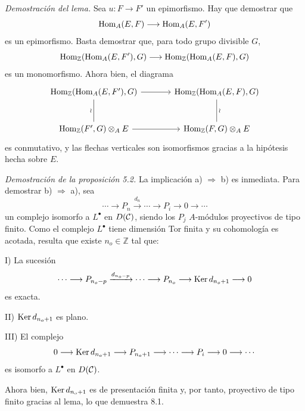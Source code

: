\emph{Demostración del lema.} Sea $u:F\to F'$ un epimorfismo. Hay que demostrar que
\[
\operatorname{Hom}_A(E,F)\longrightarrow\operatorname{Hom}_A(E,F')
\]
es un epimorfismo. Basta demostrar que, para todo grupo divisible $G$,
\[
\operatorname{Hom}_{\mathbb Z}(\operatorname{Hom}_A(E,F'),G)\longrightarrow
\operatorname{Hom}_{\mathbb Z}(\operatorname{Hom}_A(E,F),G)
\]
es un monomorfismo. Ahora bien, el diagrama
\[
\begin{tikzcd}[column sep=large,row sep=large]
\Hom_{\mathbb Z}(\Hom_A(E,F'),G)
 \arrow[r]\arrow[d,dash,"\wr"']&
\Hom_{\mathbb Z}(\Hom_A(E,F),G)\arrow[d,dash,"\wr"]\\
\Hom_{\mathbb Z}(F',G)\otimes_A E
 \arrow[r]&
\Hom_{\mathbb Z}(F,G)\otimes_A E
\end{tikzcd}
\]
es conmutativo, y las flechas verticales son isomorfismos gracias a la hipótesis hecha sobre $E$.

\emph{Demostración de la proposición 5.2.} La implicación a) $\Rightarrow$ b) es inmediata. Para demostrar b) $\Rightarrow$ a), sea
\[
\cdots\longrightarrow P_n\xrightarrow{d_n}\cdots\longrightarrow P_i\longrightarrow 0\longrightarrow\cdots
\]
un complejo isomorfo a $L^\bullet$ en $D(\mathcal C)$, siendo los $P_j$ $A$-módulos proyectivos de tipo finito. Como el complejo $L^\bullet$ tiene dimensión Tor finita y su cohomología es acotada, resulta que existe $n_o\in\mathbb Z$ tal que:

I) La sucesión
\[
\cdots\longrightarrow P_{n_o-p}\xrightarrow{d_{n_o-p}}\cdots\longrightarrow
P_{n_o}\longrightarrow \operatorname{Ker} d_{n_o+1}\longrightarrow0
\]
es exacta.

II) $\operatorname{Ker} d_{n_o+1}$ es plano.

III) El complejo
\[
0\longrightarrow \operatorname{Ker} d_{n_o+1}\longrightarrow P_{n_o+1}\longrightarrow\cdots\longrightarrow P_i\longrightarrow0\longrightarrow\cdots
\]
es isomorfo a $L^\bullet$ en $D(\mathcal C)$.

Ahora bien, $\operatorname{Ker} d_{n_o+1}$ es de presentación finita y, por tanto, proyectivo de tipo finito gracias al lema, lo que demuestra 8.1.
